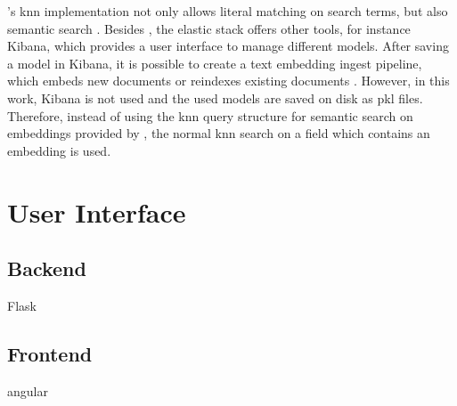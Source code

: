 \databaseName{}'s \ac{knn} implementation not only allows literal matching on search terms, but also semantic search \cite{Elasticsearch-knn}.
Besides \databaseName{}, the elastic stack offers other tools, for instance Kibana, which provides a user interface to manage different models.
After saving a model in Kibana, it is possible to create a text embedding ingest pipeline, which embeds new documents or reindexes existing documents \cite{Elasticsearch-knn-embedding}.
However, in this work, Kibana is not used and the used models are saved on disk as \ac{pkl} files.
Therefore, instead of using the \ac{knn} query structure for semantic search on embeddings provided by \databaseName{}, the normal \ac{knn} search on a field which contains an embedding is used.


\section{User Interface}\label{sec:ui}

\subsection{Backend}\label{subsec:backend}
Flask

\subsection{Frontend}\label{subsec:frontend}
angular